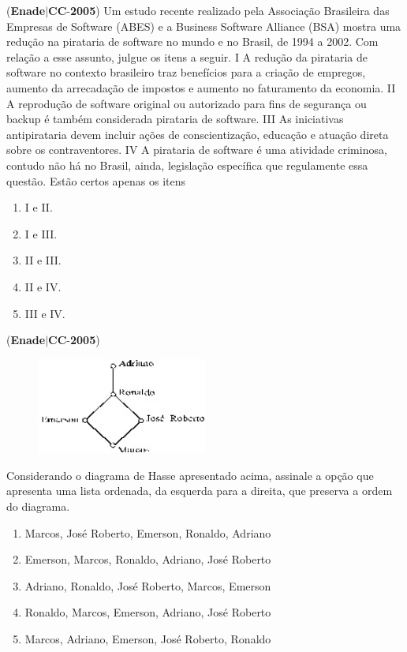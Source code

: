 \documentclass{exam}
\begin{document}
\begin{questions}
\question (\textbf{Enade}$|$\textbf{CC}-\textbf{2005}) Um estudo recente realizado pela Associação Brasileira das
Empresas de Software (ABES) e a Business Software Alliance
(BSA) mostra uma redução na pirataria de software no mundo e no
Brasil, de 1994 a 2002. Com relação a esse assunto, julgue os itens
a seguir.
I A redução da pirataria de software no contexto brasileiro traz
benefícios para a criação de empregos, aumento da arrecadação
de impostos e aumento no faturamento da economia.
II A reprodução de software original ou autorizado para fins de
segurança ou backup é também considerada pirataria de
software.
III As iniciativas antipirataria devem incluir ações de
conscientização, educação e atuação direta sobre os
contraventores.
IV A pirataria de software é uma atividade criminosa, contudo não
há no Brasil, ainda, legislação específica que regulamente essa
questão.
Estão certos apenas os itens
	\begin{enumerate}[label=\alph*)]
		\item  I e II.
		\item  I e III.
		\item  II e III.
		\item  II e IV.
		\item  III e IV.

	\end{enumerate}

\question (\textbf{Enade}$|$\textbf{CC}-\textbf{2005}) \begin{figure}[H]
	\begin{center}
		\includegraphics[width=0.5\textwidth]{CIENCIA_DA_COMPUTACAO_Prova2005-utf8_figuras/fig-0017.jpg}
	\end{center}
\end{figure}
Considerando o diagrama de Hasse apresentado acima,
assinale a opção que apresenta uma lista ordenada, da
esquerda para a direita, que preserva a ordem do diagrama.
	\begin{enumerate}[label=\alph*)]
		\item  Marcos, José Roberto, Emerson, Ronaldo, Adriano
		\item  Emerson, Marcos, Ronaldo, Adriano, José Roberto
		\item  Adriano, Ronaldo, José Roberto, Marcos, Emerson
		\item  Ronaldo, Marcos, Emerson, Adriano, José Roberto
		\item  Marcos, Adriano, Emerson, José Roberto, Ronaldo


\end{enumerate}
\end{questions}
\end{document}

